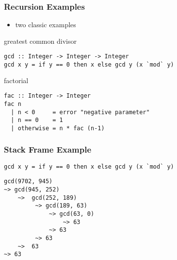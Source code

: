 \documentclass[dvipsnames]{beamer}
\theoremstyle{plain}
\begin{document}
\begin{frame}[fragile]
  \frametitle{Recursion Examples}

  \begin{itemize}
    \item two classic examples
  \end{itemize}

  \begin{exampleblock}{greatest common divisor}
    \begin{lstlisting}
gcd :: Integer -> Integer -> Integer
gcd x y = if y == 0 then x else gcd y (x `mod` y)
    \end{lstlisting}
  \end{exampleblock}

  \begin{exampleblock}{factorial}
    \begin{lstlisting}
fac :: Integer -> Integer
fac n
  | n < 0     = error "negative parameter"
  | n == 0    = 1
  | otherwise = n * fac (n-1)
    \end{lstlisting}
  \end{exampleblock}
\end{frame}

\begin{frame}[fragile]
  \frametitle{Stack Frame Example}

  \begin{lstlisting}
gcd x y = if y == 0 then x else gcd y (x `mod` y)
  \end{lstlisting}

  \lstinline{gcd(9702, 945)}\\
  \lstinline{~> gcd(945, 252)}\\
  \lstinline{    ~>  gcd(252, 189)}\\
  \lstinline{         ~> gcd(189, 63)}\\
  \lstinline{             ~> gcd(63, 0)}\\
  \lstinline{                 ~> 63}\\
  \lstinline{             ~> 63}\\
  \lstinline{         ~> 63}\\
  \lstinline{    ~>  63}\\
  \lstinline{~> 63}
\end{frame}
\end{document}
